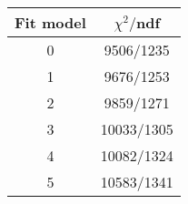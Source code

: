 \begin{tabular}{c|c}
Fit model & $\chi^2/$ndf \\
\hline
0 & 9506/1235\\
1 & 9676/1253\\
2 & 9859/1271\\
3 & 10033/1305\\
4 & 10082/1324\\
5 & 10583/1341\\
\end{tabular}
